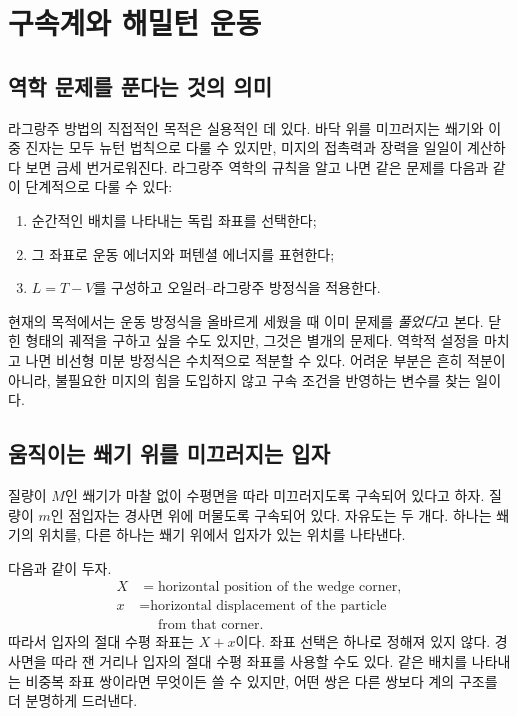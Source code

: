 \chapter{구속계와 해밀턴 운동}


\section{역학 문제를 푼다는 것의 의미}

라그랑주 방법의 직접적인 목적은 실용적인 데 있다. 바닥 위를 미끄러지는 쐐기와 이중 진자는 모두 뉴턴 법칙으로 다룰 수 있지만, 미지의 접촉력과 장력을 일일이 계산하다 보면 금세 번거로워진다. 라그랑주 역학의 규칙을 알고 나면 같은 문제를 다음과 같이 단계적으로 다룰 수 있다:
\begin{enumerate}
  \item 순간적인 배치를 나타내는 독립 좌표를 선택한다;
  \item 그 좌표로 운동 에너지와 퍼텐셜 에너지를 표현한다;
  \item \(L=T-V\)를 구성하고 오일러--라그랑주 방정식을 적용한다.
\end{enumerate}

현재의 목적에서는 운동 방정식을 올바르게 세웠을 때 이미 문제를 \emph{풀었다}고 본다. 닫힌 형태의 궤적을 구하고 싶을 수도 있지만, 그것은 별개의 문제다. 역학적 설정을 마치고 나면 비선형 미분 방정식은 수치적으로 적분할 수 있다. 어려운 부분은 흔히 적분이 아니라, 불필요한 미지의 힘을 도입하지 않고 구속 조건을 반영하는 변수를 찾는 일이다.

\section{움직이는 쐐기 위를 미끄러지는 입자}

질량이 \(M\)인 쐐기가 마찰 없이 수평면을 따라 미끄러지도록 구속되어 있다고 하자. 질량이 \(m\)인 점입자는 경사면 위에 머물도록 구속되어 있다. 자유도는 두 개다. 하나는 쐐기의 위치를, 다른 하나는 쐐기 위에서 입자가 있는 위치를 나타낸다.

다음과 같이 두자.
\begin{equation}
  \begin{aligned}
    X&=\text{horizontal position of the wedge corner},\\
    x&=\text{horizontal displacement of the particle}\\[-0.2em]
     &\phantom{={}}\text{from that corner}.
  \end{aligned}
  \label{eq:l6-wedge-coordinates}
\end{equation}
따라서 입자의 절대 수평 좌표는 \(X+x\)이다. 좌표 선택은 하나로 정해져 있지 않다. 경사면을 따라 잰 거리나 입자의 절대 수평 좌표를 사용할 수도 있다. 같은 배치를 나타내는 비중복 좌표 쌍이라면 무엇이든 쓸 수 있지만, 어떤 쌍은 다른 쌍보다 계의 구조를 더 분명하게 드러낸다.

